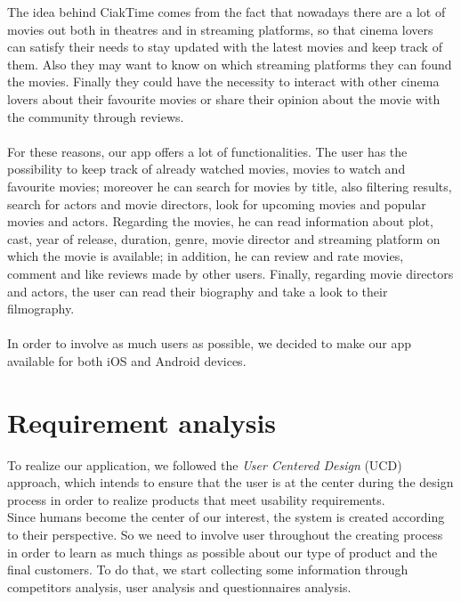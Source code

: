 \documentclass[12pt, a4paper]{article}
\numberwithin{figure}{section}
\begin{document}
The idea behind CiakTime comes from the fact that nowadays there are a lot of movies out
both in theatres and in streaming platforms, so that cinema lovers can satisfy their
needs to stay updated with the latest movies and keep track of them.
Also they may want to know on which streaming platforms they can found the movies.
Finally they could have the necessity to interact with other cinema lovers about their
favourite movies or share their opinion about the movie with the community through reviews.
\\\\
For these reasons, our app offers a lot of functionalities.
The user has the possibility to keep track of already watched movies, movies to watch and favourite movies;
moreover he can search for movies by title, also filtering results, search for actors and movie directors,
look for upcoming movies and popular movies and actors.
Regarding the movies, he can read information about plot, cast, year of release, duration, genre,
movie director and streaming platform on which the movie is available; in addition, he can
review and rate movies, comment and like reviews made by other users.
Finally, regarding movie directors and actors, the user can read their biography and take a look to their
filmography.
\\\\
In order to involve as much users as possible, we decided to make our app available for both iOS and Android devices.






\newpage

\section{Requirement analysis}

To realize our application, we followed the \textit{User Centered Design} (UCD)  approach, which intends
to ensure that the user is at the center during the design process in order to realize products
that meet usability requirements.\\ 
Since humans become the center of our interest, the system is created according to their perspective.
So we need to involve user throughout the creating process in order to learn as much things as possible 
about our type of product and the final customers.
To do that, we start collecting some information through competitors analysis, user analysis and 
questionnaires analysis. 
\end{document}
